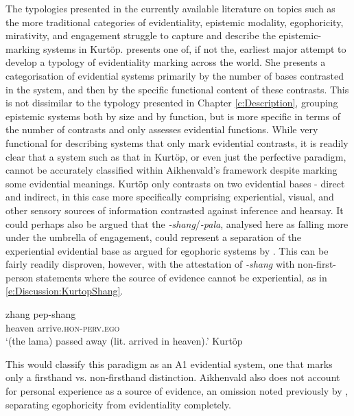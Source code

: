 The typologies presented in the currently available literature on topics such as the more traditional categories of evidentiality, epistemic modality, egophoricity, mirativity, and engagement struggle to capture and describe the epistemic-marking systems in Kurtöp.  presents one of, if not the, earliest major attempt to develop a typology of evidentiality marking across the world. She presents a categorisation of evidential systems primarily by the number of bases contrasted in the system, and then by the specific functional content of these contrasts. This is not dissimilar to the typology presented in Chapter \ref{c:Description}, grouping epistemic systems both by size and by function, but is more specific in terms of the number of contrasts and only assesses evidential functions. While very functional for describing systems that only mark evidential contrasts, it is readily clear that a system such as that in Kurtöp, or even just the perfective paradigm, cannot be accurately classified within Aikhenvald's framework despite marking some evidential meanings. Kurtöp only contrasts on two evidential bases - direct and indirect, in this case more specifically comprising experiential, visual, and other sensory sources of information contrasted against inference and hearsay. It could perhaps also be argued that the \textit{-shang}/\textit{-pala}, analysed here as falling more under the umbrella of engagement, could represent a separation of the experiential evidential base as argued for egophoric systems by . This can be fairly readily disproven, however, with the attestation of \textit{-shang} with non-first-person statements where the source of evidence cannot be experiential, as in \ref{e:Discussion:KurtopShang}.

\begin{exe}
    \ex
    \gll zhang pep-shang \\
    heaven arrive.\textsc{hon-perv.ego} \\
    \glt `(the lama) passed away (lit. arrived in heaven).' Kurtöp \cite[East Bodish: Bhutan,][114]{Hyslop2014}
\end{exe}

This would classify this paradigm as an A1 evidential system, one that marks only a firsthand vs. non-firsthand distinction. Aikhenvald also does not account for personal experience as a source of evidence, an omission noted previously by , separating egophoricity from evidentiality completely.

